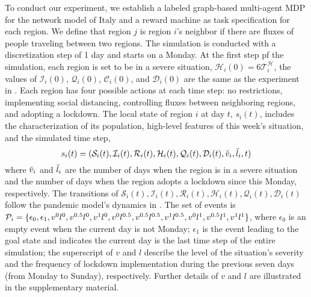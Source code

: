 \documentclass[conf]{new-aiaa}
\begin{document}
To conduct our experiment, we establish a labeled graph-based multi-agent MDP for the network model of Italy and a reward machine as task specification for each region. We define that region $j$ is region $i$'s neighbor if there are fluxes of people traveling between two regions. The simulation is conducted with a discretization step of 1 day and starts on a Monday. At the first step pf the simulation, each region is set to be in a severe situation,  $\mathcal{H}_i(0) = 6\mathcal{T}_i^\mathcal{H}$,  the values of $\mathcal{I}_i(0)$, $\mathcal{Q}_i(0)$, $\mathcal{C}_i(0)$, and $\mathcal{D}_i(0)$ are the same as the experiment in \cite{della2020intermittent}. Each region has four possible actions at each time step: no restrictions, implementing social distancing, controlling fluxes between neighboring regions, and adopting a lockdown. The local state of region $i$ at day $t$, $s_i(t)$, includes the characterization of its population, high-level features of this week's situation, and the simulated time step, \begin{equation}
    s_i(t) = (\mathcal{S}_i(t), \mathcal{I}_i(t), \mathcal{R}_i(t), \mathcal{H}_i(t), \mathcal{Q}_i(t), \mathcal{D}_i(t), \Tilde{v}_i, \Tilde{l}_i, t)
\end{equation}
where $\Tilde{v}_i$ and $\Tilde{l}_i$ are the number of days when the region is in a severe situation and the number of days when the region adopts a lockdown since this Monday, respectively. The transitions of $\mathcal{S}_i(t), \mathcal{I}_i(t), \mathcal{R}_i(t), \mathcal{H}_i(t), \mathcal{Q}_i(t), \mathcal{D}_i(t)$ follow the pandemic model's dynamics in \cite{della2020intermittent}. The set of events is $\mathcal{P}_i=\{ \epsilon_0, \epsilon_1,  v^0l^0,  v^{0.5}l^0, v^1l^0, v^0l^{0.5},  v^{0.5}l^{0.5}, v^1l^{0.5}, v^0l^1,  v^{0.5}l^1, \\ v^1l^1\}$, where $\epsilon_0$ is an empty event when the current day is not Monday; $\epsilon_1$ is the event leading to the goal state and indicates the current day is the last time step of the entire simulation; the superscript of $v$ and $l$ describe the level of the situation's severity and the frequency of lockdown implementation during the previous seven days (from Monday to Sunday), respectively. Further details of $v$ and $l$ are illustrated in the supplementary material.
\end{document}
